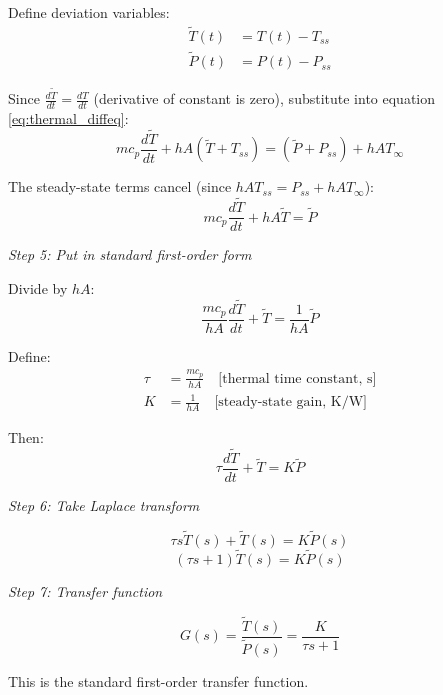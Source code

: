 \begin{example}
Define deviation variables:
\begin{align}
\tilde{T}(t) &= T(t) - T_{ss} \\
\tilde{P}(t) &= P(t) - P_{ss}
\end{align}

Since $\frac{d\tilde{T}}{dt} = \frac{dT}{dt}$ (derivative of constant is zero), substitute into equation \eqref{eq:thermal_diffeq}:
\begin{equation}
mc_p\frac{d\tilde{T}}{dt} + hA(\tilde{T} + T_{ss}) = (\tilde{P} + P_{ss}) + hAT_\infty
\end{equation}

The steady-state terms cancel (since $hAT_{ss} = P_{ss} + hAT_\infty$):
\begin{equation}
mc_p\frac{d\tilde{T}}{dt} + hA\tilde{T} = \tilde{P}
\end{equation}

\textit{Step 5: Put in standard first-order form}

Divide by $hA$:
\begin{equation}
\frac{mc_p}{hA}\frac{d\tilde{T}}{dt} + \tilde{T} = \frac{1}{hA}\tilde{P}
\end{equation}

Define:
\begin{align}
\tau &= \frac{mc_p}{hA} \quad \text{[thermal time constant, s]} \\
K &= \frac{1}{hA} \quad \text{[steady-state gain, K/W]}
\end{align}

Then:
\begin{equation}
\tau\frac{d\tilde{T}}{dt} + \tilde{T} = K\tilde{P}
\end{equation}

\textit{Step 6: Take Laplace transform}

\begin{equation}
\tau s \tilde{T}(s) + \tilde{T}(s) = K\tilde{P}(s)
\end{equation}
\begin{equation}
(\tau s + 1)\tilde{T}(s) = K\tilde{P}(s)
\end{equation}

\textit{Step 7: Transfer function}

\begin{equation}
G(s) = \frac{\tilde{T}(s)}{\tilde{P}(s)} = \frac{K}{\tau s + 1}
\end{equation}

This is the standard first-order transfer function.


\end{example}
